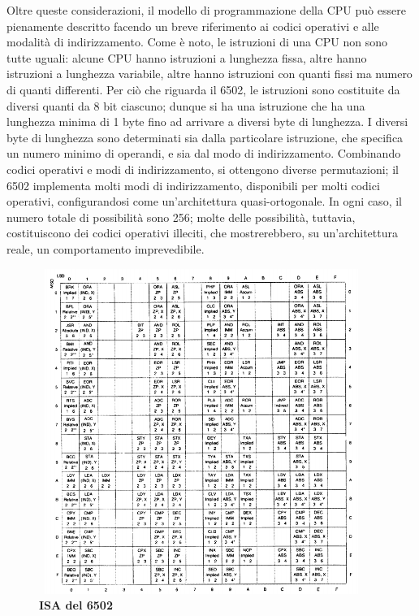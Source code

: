 \documentclass[11pt]{article}
\begin{document}
Oltre queste considerazioni, il modello di programmazione della CPU può essere pienamente descritto facendo un breve riferimento ai codici operativi e alle modalità di indirizzamento. Come è noto, le istruzioni di una CPU non sono tutte uguali: alcune CPU hanno istruzioni a lunghezza fissa, altre hanno istruzioni a lunghezza variabile, altre hanno istruzioni con quanti fissi ma numero di quanti differenti. Per ciò che riguarda il 6502, le istruzioni sono costituite da diversi quanti da 8 bit ciascuno; dunque si ha una istruzione che ha una lunghezza minima di 1 byte fino ad arrivare a diversi byte di lunghezza. I diversi byte di lunghezza sono determinati sia dalla particolare istruzione, che specifica un numero minimo di operandi, e sia dal modo di indirizzamento.
\clearpage
Combinando codici operativi e modi di indirizzamento, si ottengono diverse permutazioni; il 6502 implementa molti modi di indirizzamento, disponibili per molti codici operativi, configurandosi come un'architettura quasi-ortogonale. In ogni caso, il numero totale di possibilità sono 256; molte delle possibilità, tuttavia, costituiscono dei codici operativi illeciti, che mostrerebbero, su un'architettura reale, un comportamento imprevedibile.
\begin{figure}[h]
\hspace*{-1cm}
\centering
\includegraphics[width=400px, height=400px]{6502_INSTRUCTION_SET.png}
\small\textbf{ISA del 6502}
\end{figure}
\clearpage
\end{document}
